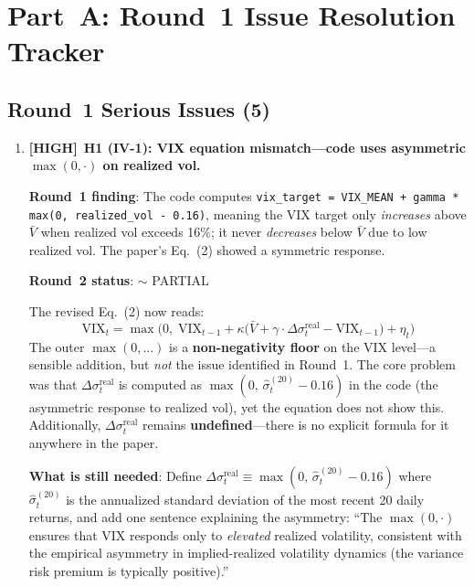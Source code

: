 \documentclass[12pt,a4paper]{article}
\newcommand{\HIGH}{\textbf{\textcolor{errorred}{[HIGH]}}}
\newcommand{\PARTIAL}{\textcolor{warncolor}{$\sim$ PARTIAL}}
\begin{document}
\section*{Part~A: Round~1 Issue Resolution Tracker}

\subsection*{\textcolor{errorred}{Round~1 Serious Issues (5)}}

\begin{enumerate}

\item \HIGH\ \textbf{H1 (IV-1): VIX equation mismatch---code uses asymmetric $\max(0,\cdot)$ on realized vol.}

\textbf{Round~1 finding}: The code computes \texttt{vix\_target = VIX\_MEAN + gamma * max(0, realized\_vol - 0.16)}, meaning the VIX target only \emph{increases} above $\bar{V}$ when realized vol exceeds 16\%; it never \emph{decreases} below $\bar{V}$ due to low realized vol. The paper's Eq.~(2) showed a symmetric response.

\textbf{Round~2 status}: \PARTIAL

The revised Eq.~(2) now reads:
\[
\text{VIX}_t = \max\!\Big(0,\; \text{VIX}_{t-1} + \kappa\big(\bar{V} + \gamma \cdot \Delta\sigma^{\text{real}}_t - \text{VIX}_{t-1}\big) + \eta_t\Big)
\]
The outer $\max(0,\ldots)$ is a \textbf{non-negativity floor} on the VIX level---a sensible addition, but \emph{not} the issue identified in Round~1. The core problem was that $\Delta\sigma^{\text{real}}_t$ is computed as $\max(0,\, \hat{\sigma}^{(20)}_t - 0.16)$ in the code (the asymmetric response to realized vol), yet the equation does not show this. Additionally, $\Delta\sigma^{\text{real}}_t$ remains \textbf{undefined}---there is no explicit formula for it anywhere in the paper.

\textbf{What is still needed}: Define $\Delta\sigma^{\text{real}}_t \equiv \max(0,\, \hat{\sigma}^{(20)}_t - 0.16)$ where $\hat{\sigma}^{(20)}_t$ is the annualized standard deviation of the most recent 20 daily returns, and add one sentence explaining the asymmetry: ``The $\max(0,\cdot)$ ensures that VIX responds only to \emph{elevated} realized volatility, consistent with the empirical asymmetry in implied-realized volatility dynamics (the variance risk premium is typically positive).''


\end{enumerate}
\end{document}
